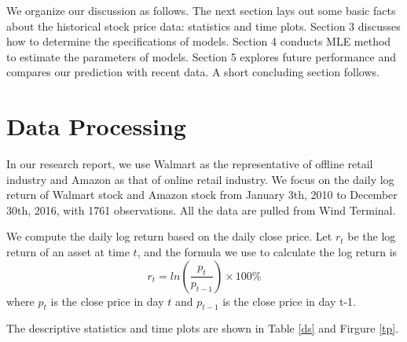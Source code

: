\documentclass[paper=a4, fontsize=11pt]{article}
\begin{document}
We organize our discussion as follows. The next section lays out some basic facts about the historical stock price data: statistics and time plots. Section 3 discusses how to determine the specifications of models. Section 4 conducts MLE method to estimate the parameters of models. Section 5 explores future performance and compares our prediction with recent data. A short concluding section follows.

\section{Data Processing}
In our research report, we use Walmart as the representative of offline retail industry and Amazon as that of online retail industry. We focus on the daily log return of Walmart stock and Amazon stock from January 3th, 2010 to December 30th, 2016, with 1761 observations. All the data are pulled from Wind Terminal.

We compute the daily log return based on the  daily close price. Let $r_t$ be the log return of an asset at time $t$, and the formula we use to calculate the log return is
\[ r_t = ln(\frac{p_t}{p_{t-1}}) \times 100\% \]
where $p_t$ is the close price in day $t$ and $p_{t-1}$ is the close price in day {t-1}.

The descriptive statistics and time plots are shown in Table \ref{ds} and Firgure \ref{tp}.
\end{document}
